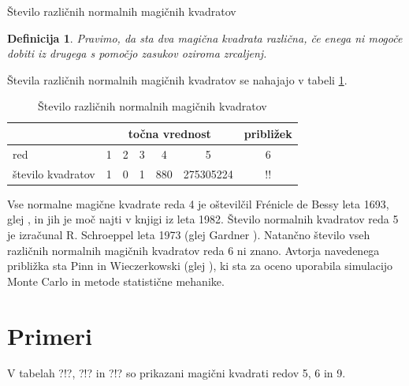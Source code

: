 \documentclass[a4paper,12pt]{article}
\newtheorem{definicija}{Definicija}
\newcommand{\pojem}[1]{\emph{\color{purple}#1}}
\begin{document}
Število različnih normalnih magičnih kvadratov

\begin{definicija}
      Pravimo, da sta dva magična kvadrata \pojem{različna}, če enega ni mogoče dobiti
      iz drugega s pomočjo zasukov oziroma zrcaljenj.
\end{definicija}

Števila različnih normalnih magičnih kvadratov se nahajajo v tabeli \ref{table:stevila}.


\begin{table}
   \centering
   \begin{tabular}{lcccccc}\toprule
            &\multicolumn{5}{c}{točna vrednost} &približek\\
            \midrule
            red &1 &2 &3 &4 &5 &6\\
            število kvadratov &1 &0 &1 &880 &275305224 &!!\\
      \bottomrule
   \end{tabular}
   \caption{Število različnih normalnih magičnih kvadratov}
   \label{table:stevila}
\end{table}

Vse normalne magične kvadrate reda 4 je oštevilčil Frénicle de Bessy
leta 1693, glej \cite{bessy}, in jih je moč najti v knjigi \cite{berlekamp}
iz leta 1982. Število normalnih kvadratov reda 5 je izračunal
R. Schroeppel leta 1973 (glej Gardner \cite{gardner}).
Natančno število vseh različnih normalnih magičnih kvadratov reda 6 ni znano.
Avtorja navedenega približka sta Pinn in Wieczerkowski (glej \cite{pinn}), ki
sta za oceno uporabila simulacijo Monte Carlo in metode statistične mehanike.


\section{Primeri}

V tabelah ?!?, ?!? in ?!? so prikazani
magični kvadrati redov 5, 6 in 9.

\end{document}
